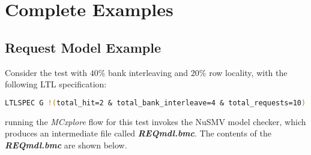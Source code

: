 \section{Complete Examples}
\subsection{Request Model Example}
Consider the test with $40\%$ bank interleaving and $20\%$ row locality, with the following LTL specification:
\begin{lstlisting}[language=bash]
LTLSPEC G !(total_hit=2 & total_bank_interleave=4 & total_requests=10)
\end{lstlisting} 
running the \textit{MCxplore} flow for this test invokes the NuSMV model checker, which produces an intermediate file called \textbf{\textit{REQmdl.bmc}}. 
The contents of the  \textbf{\textit{REQmdl.bmc}} are shown below. 
